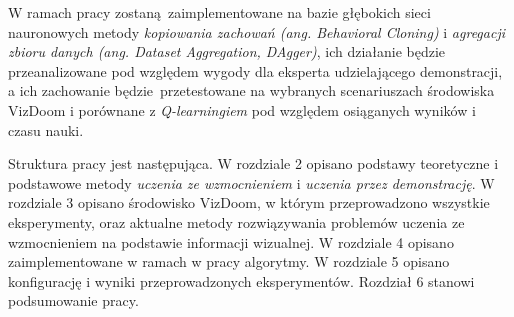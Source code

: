 W ramach pracy zostaną zaimplementowane na bazie głębokich sieci nauronowych metody \textit{kopiowania zachowań (ang. Behavioral Cloning)} i \textit{agregacji zbioru danych (ang. Dataset Aggregation, DAgger)}, ich działanie będzie przeanalizowane pod względem wygody dla eksperta udzielającego demonstracji, a ich zachowanie będzie przetestowane na wybranych scenariuszach środowiska VizDoom i porównane z \textit {Q-learningiem} pod względem osiąganych wyników i czasu nauki.

Struktura pracy jest następująca. W rozdziale 2 opisano podstawy teoretyczne i podstawowe metody \textit{uczenia ze wzmocnieniem} i \textit{uczenia przez demonstrację}. W rozdziale 3 opisano środowisko VizDoom, w którym przeprowadzono wszystkie eksperymenty, oraz aktualne metody rozwiązywania problemów uczenia ze wzmocnieniem na podstawie informacji wizualnej. W rozdziale 4 opisano zaimplementowane w ramach w pracy algorytmy. W rozdziale 5 opisano konfigurację i wyniki przeprowadzonych eksperymentów. Rozdział 6 stanowi podsumowanie pracy.





